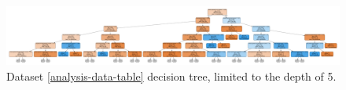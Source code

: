 \begin{figure}[htb]
\centering
\includegraphics[width=\linewidth]{figs/decision-tree-depth-5.pdf}
\caption{Dataset \ref{analysis-data-table} decision tree, limited to the depth of 5.}
\label{decision-tree-depth-5}
\end{figure}

